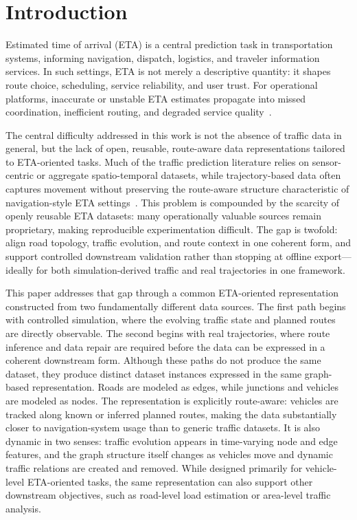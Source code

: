 \section{Introduction}

Estimated time of arrival (ETA) is a central prediction task in transportation systems, informing navigation, dispatch, logistics, and traveler information services. In such settings, ETA is not merely a descriptive quantity: it shapes route choice, scheduling, service reliability, and user trust. For operational platforms, inaccurate or unstable ETA estimates propagate into missed coordination, inefficient routing, and degraded service quality~\cite{modica2024eta}.

The central difficulty addressed in this work is not the absence of traffic data in general, but the lack of open, reusable, route-aware data representations tailored to ETA-oriented tasks. Much of the traffic prediction literature relies on sensor-centric or aggregate spatio-temporal datasets, while trajectory-based data often captures movement without preserving the route-aware structure characteristic of navigation-style ETA settings~\cite{yu2017trafficpred}. This problem is compounded by the scarcity of openly reusable ETA datasets: many operationally valuable sources remain proprietary, making reproducible experimentation difficult. The gap is twofold: align road topology, traffic evolution, and route context in one coherent form, and support controlled downstream validation rather than stopping at offline export---ideally for both simulation-derived traffic and real trajectories in one framework.

This paper addresses that gap through a common ETA-oriented representation constructed from two fundamentally different data sources. The first path begins with controlled simulation, where the evolving traffic state and planned routes are directly observable. The second begins with real trajectories, where route inference and data repair are required before the data can be expressed in a coherent downstream form. Although these paths do not produce the same dataset, they produce distinct dataset instances expressed in the same graph-based representation. Roads are modeled as edges, while junctions and vehicles are modeled as nodes. The representation is explicitly route-aware: vehicles are tracked along known or inferred planned routes, making the data substantially closer to navigation-system usage than to generic traffic datasets. It is also dynamic in two senses: traffic evolution appears in time-varying node and edge features, and the graph structure itself changes as vehicles move and dynamic traffic relations are created and removed. While designed primarily for vehicle-level ETA-oriented tasks, the same representation can also support other downstream objectives, such as road-level load estimation or area-level traffic analysis.

